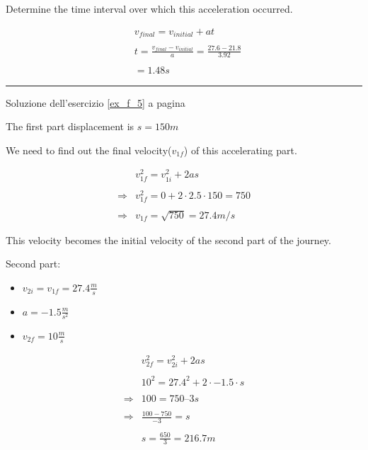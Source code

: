 Determine the time interval over which this acceleration occurred.


\begin{equation}
\begin{split}
&v_{final} = v_{initial} + at \\
\\
&t = \frac{v_{final}-v_{initial}}{a} = \frac{27.6-21.8}{3.92} \\
\\
&= 1.48 s
\end{split}
\end{equation}


\vspace{1cm}
\hrule
\vspace{1cm}

Soluzione dell'esercizio \ref{ex_f_5} a pagina \pageref{ex_f_5}\label{sol_f_5}


The first part displacement is $s = 150 m$

We need to find out the final velocity($v_{1f}$) of this accelerating part.

\begin{equation}
\begin{split}
&v_{1f}^2 = v_{1i}^2 + 2as\\
\\
\Rightarrow & v_{1f}^2 = 0 + 2\cdot 2.5 \cdot 150 = 750\\
\\
\Rightarrow & v_{1f} = \sqrt{750} = 27.4 m/s
\end{split}
\end{equation}

This velocity becomes the initial velocity of the second part of the journey.

Second part:

\begin{itemize}
\item $v_{2i} = v_{1f} = 27.4 \frac{m}{s}$
\item $a = -1.5 \frac{m}{s^2}$
\item $v_{2f}= 10 \frac{m}{s}$
\end{itemize}

\begin{equation}
\begin{split}
&v_{2f}^2 = v_{2i}^2 + 2as \\
\\
&10^2 = {27.4}^2 + 2\cdot -1.5 \cdot s \\
\\
\Rightarrow &100 = 750 – 3s \\
\\
\Rightarrow &\frac{100 -750}{-3} = s \\
\\
&s= \frac{650}{3} = 216.7 m
\end{split}
\end{equation}

